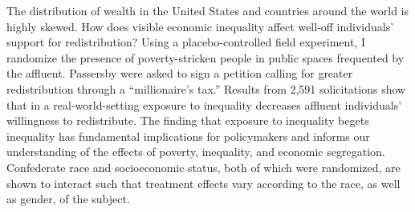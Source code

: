 The distribution of wealth in the United States and countries around the world is highly skewed. How does visible economic inequality affect well-off individuals’ support for redistribution? Using a placebo-controlled field experiment, I randomize the presence of poverty-stricken people in public spaces frequented by the affluent. Passersby were asked to sign a petition calling for greater redistribution through a “millionaire’s tax.” Results from 2,591 solicitations show that in a real-world-setting exposure to inequality decreases affluent individuals’ willingness to redistribute. The finding that exposure to inequality begets inequality has fundamental implications for policymakers and informs our understanding of the effects of poverty, inequality, and economic segregation. Confederate race and socioeconomic status, both of which were randomized, are shown to interact such that treatment effects vary according to the race, as well as gender, of the subject.